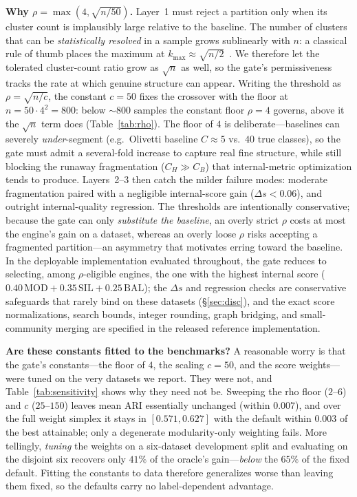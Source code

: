 \documentclass[journal]{IEEEtran}
\begin{document}
\textbf{Why $\rho=\max(4,\sqrt{n/50})$.} Layer~1 must reject a partition only when its cluster count is implausibly large relative to the baseline. The number of clusters that can be \emph{statistically resolved} in a sample grows sublinearly with $n$: a classical rule of thumb places the maximum at $k_{\max}\approx\sqrt{n/2}$~\cite{mardia1979multivariate}. We therefore let the tolerated cluster-count ratio grow as $\sqrt{n}$ as well, so the gate's permissiveness tracks the rate at which genuine structure can appear. Writing the threshold as $\rho=\sqrt{n/c}$, the constant $c{=}50$ fixes the crossover with the floor at $n=50\cdot4^2=800$: below ${\sim}800$ samples the constant floor $\rho{=}4$ governs, above it the $\sqrt{n}$ term does (Table~\ref{tab:rho}). The floor of $4$ is deliberate---baselines can severely \emph{under}-segment (e.g.\ Olivetti baseline $C{\approx}5$ vs.\ $40$ true classes), so the gate must admit a several-fold increase to capture real fine structure, while still blocking the runaway fragmentation ($C_H\!\gg\!C_B$) that internal-metric optimization tends to produce. Layers~2--3 then catch the milder failure modes: moderate fragmentation paired with a negligible internal-score gain ($\Delta s<0.06$), and outright internal-quality regression. The thresholds are intentionally conservative; because the gate can only \emph{substitute the baseline}, an overly strict $\rho$ costs at most the engine's gain on a dataset, whereas an overly loose $\rho$ risks accepting a fragmented partition---an asymmetry that motivates erring toward the baseline. In the deployable implementation evaluated throughout, the gate reduces to selecting, among $\rho$-eligible engines, the one with the highest internal score ($0.40\,\mathrm{MOD}+0.35\,\mathrm{SIL}+0.25\,\mathrm{BAL}$); the $\Delta s$ and regression checks are conservative safeguards that rarely bind on these datasets (\S\ref{sec:disc}), and the exact score normalizations, search bounds, integer rounding, graph bridging, and small-community merging are specified in the released reference implementation.



\textbf{Are these constants fitted to the benchmarks?} A reasonable worry is that the gate's constants---the floor of $4$, the scaling $c{=}50$, and the score weights---were tuned on the very datasets we report. They were not, and Table~\ref{tab:sensitivity} shows why they need not be. Sweeping the rho floor ($2$--$6$) and $c$ ($25$--$150$) leaves mean ARI essentially unchanged (within $0.007$), and over the full weight simplex it stays in $[0.571, 0.627]$ with the default within $0.003$ of the best attainable; only a degenerate modularity-only weighting fails. More tellingly, \emph{tuning} the weights on a six-dataset development split and evaluating on the disjoint six recovers only $41\%$ of the oracle's gain---\emph{below} the $65\%$ of the fixed default. Fitting the constants to data therefore generalizes worse than leaving them fixed, so the defaults carry no label-dependent advantage.
\end{document}
